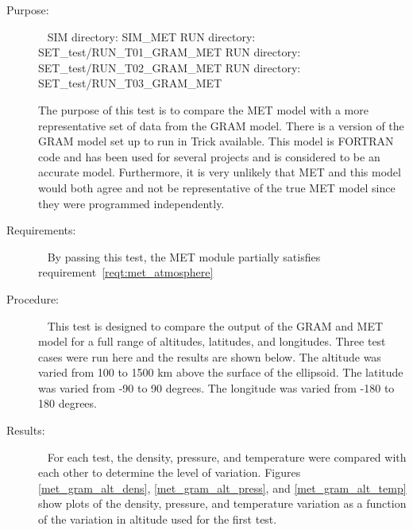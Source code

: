 \label{test:met_CML_GRAM}
\begin{description}
\item[Purpose:] \ \newline
SIM directory: SIM\_MET \newline
RUN directory: SET\_test/RUN\_T01\_GRAM\_MET \newline
RUN directory: SET\_test/RUN\_T02\_GRAM\_MET \newline
RUN directory: SET\_test/RUN\_T03\_GRAM\_MET

The purpose of this test is to compare the MET model with a more representative
set of data from the GRAM model.  There is a version of the GRAM model set up
to run in Trick available.  This model is FORTRAN code and has been used
for several projects and is considered to be an accurate model.  Furthermore, it
is very unlikely that MET and this model would both agree and not be
representative of the true MET model since they were programmed independently.

\item[Requirements:] \ \newline
By passing this test, the MET module partially satisfies
requirement~\ref{reqt:met_atmosphere}
\item[Procedure:]\ \newline
This test is designed to compare the output of the GRAM and MET model for a full
range of altitudes, latitudes, and longitudes.  Three test cases were run here
and the results are shown below.  The altitude was varied from 100 to 1500 km
above the surface of the ellipsoid.  The latitude was varied from -90 to 90
degrees.  The longitude was varied from -180 to 180 degrees.

\item[Results:]\ \newline
For each test, the density, pressure, and temperature were compared with each
other to determine the level of variation. Figures \ref{met_gram_alt_dens},
\ref{met_gram_alt_press}, and \ref{met_gram_alt_temp} show plots of the density,
pressure, and temperature variation as a function of the variation in altitude
used for the first test.


\end{description}
